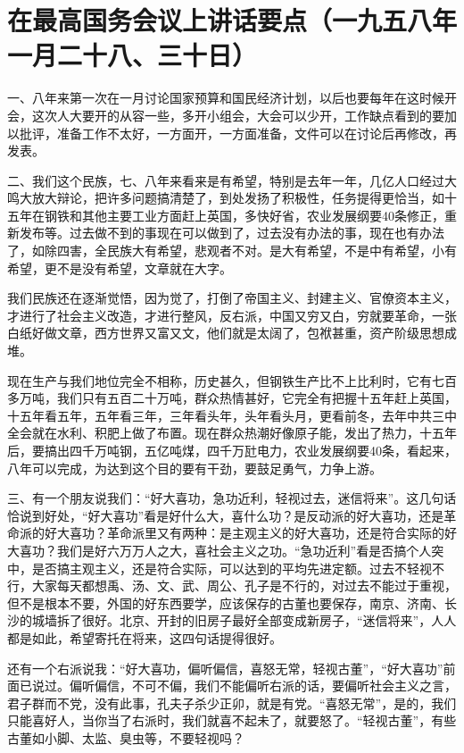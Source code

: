 \section[在最高国务会议上讲话要点（一九五八年一月二十八、三十日）]{在最高国务会议上讲话要点（一九五八年一月二十八、三十日）}


一、八年来第一次在一月讨论国家预算和国民经济计划，以后也要每年在这时候开会，这次人大要开的从容一些，多开小组会，大会可以少开，工作缺点看到的要加以批评，准备工作不太好，一方面开，一方面准备，文件可以在讨论后再修改，再发表。

二、我们这个民族，七、八年来看来是有希望，特别是去年一年，几亿人口经过大鸣大放大辩论，把许多问题搞清楚了，到处发扬了积极性，任务提得更恰当，如十五年在钢铁和其他主要工业方面赶上英国，多快好省，农业发展纲要40条修正，重新发布等。过去做不到的事现在可以做到了，过去没有办法的事，现在也有办法了，如除四害，全民族大有希望，悲观者不对。是大有希望，不是中有希望，小有希望，更不是没有希望，文章就在大字。

我们民族还在逐渐觉悟，因为觉了，打倒了帝国主义、封建主义、官僚资本主义，才进行了社会主义改造，才进行整风，反右派，中国又穷又白，穷就要革命，一张白纸好做文章，西方世界又富又文，他们就是太阔了，包袱甚重，资产阶级思想成堆。

现在生产与我们地位完全不相称，历史甚久，但钢铁生产比不上比利时，它有七百多万吨，我们只有五百二十万吨，群众热情甚好，它完全有把握十五年赶上英国，十五年看五年，五年看三年，三年看头年，头年看头月，更看前冬，去年中共三中全会就在水利、积肥上做了布置。现在群众热潮好像原子能，发出了热力，十五年后，要搞出四千万吨钢，五亿吨煤，四千万瓧电力，农业发展纲要40条，看起来，八年可以完成，为达到这个目的要有干劲，要鼓足勇气，力争上游。

三、有一个朋友说我们：“好大喜功，急功近利，轻视过去，迷信将来”。这几句话恰说到好处，“好大喜功”看是好什么大，喜什么功？是反动派的好大喜功，还是革命派的好大喜功？革命派里又有两种：是主观主义的好大喜功，还是符合实际的好大喜功？我们是好六万万人之大，喜社会主义之功。“急功近利”看是否搞个人突中，是否搞主观主义，还是符合实际，可以达到的平均先进定额。过去不轻视不行，大家每天都想禹、汤、文、武、周公、孔子是不行的，对过去不能过于重视，但不是根本不要，外国的好东西要学，应该保存的古董也要保存，南京、济南、长沙的城墙拆了很好。北京、开封的旧房子最好全部变成新房子，“迷信将来”，人人都是如此，希望寄托在将来，这四句话提得很好。

还有一个右派说我：“好大喜功，偏听偏信，喜怒无常，轻视古董”，“好大喜功”前面已说过。偏听偏信，不可不偏，我们不能偏听右派的话，要偏听社会主义之言，君子群而不党，没有此事，孔夫子杀少正卯，就是有党。“喜怒无常”，是的，我们只能喜好人，当你当了右派时，我们就喜不起未了，就要怒了。“轻视古董”，有些古董如小脚、太监、臭虫等，不要轻视吗？

